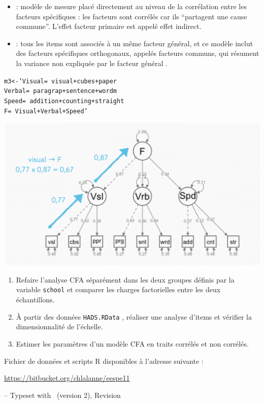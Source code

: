 
\begin{itemize}
\item {} : modèle de mesure placé directement au
  niveau de la corrélation entre les facteurs spécifiques : les facteurs sont
  corrélés car ils \enquote{partagent une cause commune}. L'effet facteur
  primaire est appelé effet indirect.
\item {} : tous les items sont associés à un même
  facteur général, et ce modèle inclut des facteurs spécifiques orthogonaux,
  appelés facteurs communs, qui résument la variance non expliquée par le
  facteur général \autocite{reise10}.
\end{itemize}


\begin{alltt}
m3 <- 'Visual =~ visual + cubes + paper
       Verbal =~ paragrap + sentence + wordm
       Speed  =~ addition + counting + straight
       F =~ Visual + Verbal + Speed'
\end{alltt}

{\centering \includegraphics[width=.5\textwidth]{figs/m4.eps}\par}


\begin{enumerate}
\item Refaire l'analyse CFA séparément dans les deux groupes définis par la
  variable \texttt{school} et comparer les charges factorielles entre les deux
  échantillons.
\item À partir des données \texttt{HADS.RData} \autocite{bartolucci16}, réaliser
  une analyse d'items et vérifier la dimensionnalité de l'échelle.
\item Estimer les paramètres d'un modèle CFA en traits corrélés et non corrélés. 
\end{enumerate}


\foilhead{}

Fichier de données et scripts R disponibles à l'adresse suivante :\newline
{\centering \url{https://bitbucket.org/chlalanne/eespe11}\par}
\vfill

\raggedleft \scriptsize -- Typeset with \FoilTeX\ (version 2), Revision \VCRevision


